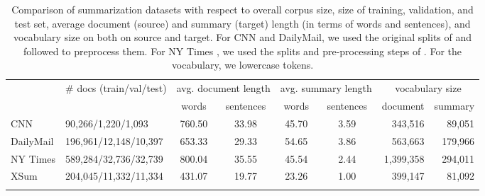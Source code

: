 \begin{table}
  \begin{center}{\footnotesize
  \begin{tabular}{ l | l | c c | c c | r r}
    \thickhline
    \multirow{2}{*}{Datasets} & \multirow{2}{*}{\# docs (train/val/test)} & \multicolumn{2}{c|}{avg. document length} & \multicolumn{2}{c|}{avg. summary length} & \multicolumn{2}{c}{vocabulary size}\\
    & & words & sentences & words & sentences & document & summary\\ \thickhline 
    CNN & 90,266/1,220/1,093 & 760.50 & 33.98 & 45.70 & 3.59 & 343,516 & 89,051 \\
    DailyMail & 196,961/12,148/10,397 & 653.33 & 29.33 & 54.65 & 3.86 & 563,663 & 179,966 \\
    NY Times & 589,284/32,736/32,739 & 800.04 & 35.55 & 45.54 & 2.44 & 1,399,358 & 294,011 \\
    XSum & 204,045/11,332/11,334 & 431.07 & 19.77 & 23.26 & 1.00 & 399,147 & 81,092 \\ \thickhline
  \end{tabular}}
  \end{center}
  \caption{Comparison of summarization datasets
    with respect to overall corpus size, size of training, validation,
    and test set, average document (source) and summary (target)
    length (in terms of words and sentences), and  vocabulary size on
    both on source and target. For CNN and DailyMail,
    we  used the original splits of
    \protect{} and followed
    \protect{} to preprocess them. For  NY
    Times  \protect\cite{nytcorpus}, we  used the splits
    and pre-processing steps of
    \protect{}. For the vocabulary, we
    lowercase tokens.} \label{table:bbc-size-comparison} 
\end{table}

